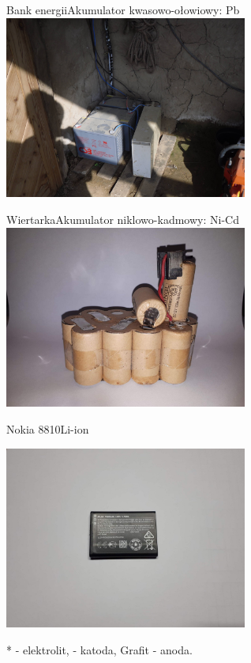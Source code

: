 \documentclass[
	11pt, %
]{beamer}
\begin{document}
\begin{frame}{Bank energii}{Akumulator kwasowo-ołowiowy: Pb}
  \centering
  \includegraphics[width=8cm]{lead-acid.jpg}

\end{frame}

\begin{frame}{Wiertarka}{Akumulator niklowo-kadmowy: Ni-Cd}
  \centering
  \includegraphics[width=8cm]{drill.jpg}

\end{frame}

\begin{frame}{Nokia 8810}{Li-ion}

  \centering
  \includegraphics[width=8cm]{phone.jpg}

	* - elektrolit,  - katoda, Grafit - anoda\cite{c05}\cite{m14}.
\end{frame}
\end{document}
